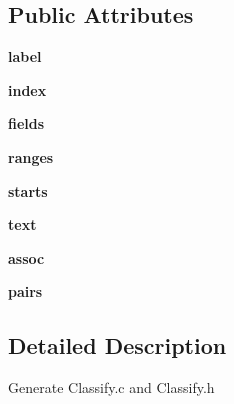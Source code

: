 \subsection*{Public Attributes}
\begin{DoxyCompactItemize}
\item 
{\bfseries label}\hypertarget{classc_1_1_classify_1_1_classify_a39504bd936bf5576befb10e0ac43d83f}{}\label{classc_1_1_classify_1_1_classify_a39504bd936bf5576befb10e0ac43d83f}

\item 
{\bfseries index}\hypertarget{classc_1_1_classify_1_1_classify_a4f7fa627ce6c996d15b94b95fc308efd}{}\label{classc_1_1_classify_1_1_classify_a4f7fa627ce6c996d15b94b95fc308efd}

\item 
{\bfseries fields}\hypertarget{classc_1_1_classify_1_1_classify_ae16c6fab346508b48b720cd04e9ce7df}{}\label{classc_1_1_classify_1_1_classify_ae16c6fab346508b48b720cd04e9ce7df}

\item 
{\bfseries ranges}\hypertarget{classc_1_1_classify_1_1_classify_a1e4a9a02e19f108821677534f7e8d60a}{}\label{classc_1_1_classify_1_1_classify_a1e4a9a02e19f108821677534f7e8d60a}

\item 
{\bfseries starts}\hypertarget{classc_1_1_classify_1_1_classify_afdb329410c16ea92a7ac17476f576fde}{}\label{classc_1_1_classify_1_1_classify_afdb329410c16ea92a7ac17476f576fde}

\item 
{\bfseries text}\hypertarget{classc_1_1_classify_1_1_classify_a301a21d13817bbbbf07d6af1226c244a}{}\label{classc_1_1_classify_1_1_classify_a301a21d13817bbbbf07d6af1226c244a}

\item 
{\bfseries assoc}\hypertarget{classc_1_1_classify_1_1_classify_ab4f473fa1589075793de2f93ebe9bfa6}{}\label{classc_1_1_classify_1_1_classify_ab4f473fa1589075793de2f93ebe9bfa6}

\item 
{\bfseries pairs}\hypertarget{classc_1_1_classify_1_1_classify_ac670ebd238054400347771255ad5d043}{}\label{classc_1_1_classify_1_1_classify_ac670ebd238054400347771255ad5d043}

\end{DoxyCompactItemize}


\subsection{Detailed Description}
\begin{DoxyVerb}Generate Classify.c and Classify.h\end{DoxyVerb}
 

